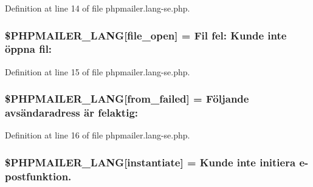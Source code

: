Definition at line 14 of file phpmailer.\+lang-\/se.\+php.

\subsubsection[{\texorpdfstring{\$\+P\+H\+P\+M\+A\+I\+L\+E\+R\+\_\+\+L\+A\+NG}{$PHPMAILER_LANG}}]{\setlength{\rightskip}{0pt plus 5cm}\$P\+H\+P\+M\+A\+I\+L\+E\+R\+\_\+\+L\+A\+NG\mbox{[}\textquotesingle{}file\+\_\+open\textquotesingle{}\mbox{]} = \textquotesingle{}Fil fel\+: Kunde inte öppna fil\+: \textquotesingle{}}\hypertarget{phpmailer_8lang-se_8php_a28d1a6517bf4c942a0ddd506188ad2e0}{}\label{phpmailer_8lang-se_8php_a28d1a6517bf4c942a0ddd506188ad2e0}


Definition at line 15 of file phpmailer.\+lang-\/se.\+php.

\subsubsection[{\texorpdfstring{\$\+P\+H\+P\+M\+A\+I\+L\+E\+R\+\_\+\+L\+A\+NG}{$PHPMAILER_LANG}}]{\setlength{\rightskip}{0pt plus 5cm}\$P\+H\+P\+M\+A\+I\+L\+E\+R\+\_\+\+L\+A\+NG\mbox{[}\textquotesingle{}from\+\_\+failed\textquotesingle{}\mbox{]} = \textquotesingle{}Följande avsändaradress är felaktig\+: \textquotesingle{}}\hypertarget{phpmailer_8lang-se_8php_adf832ae12155a09be077c6d5e4fd7e22}{}\label{phpmailer_8lang-se_8php_adf832ae12155a09be077c6d5e4fd7e22}


Definition at line 16 of file phpmailer.\+lang-\/se.\+php.

\subsubsection[{\texorpdfstring{\$\+P\+H\+P\+M\+A\+I\+L\+E\+R\+\_\+\+L\+A\+NG}{$PHPMAILER_LANG}}]{\setlength{\rightskip}{0pt plus 5cm}\$P\+H\+P\+M\+A\+I\+L\+E\+R\+\_\+\+L\+A\+NG\mbox{[}\textquotesingle{}instantiate\textquotesingle{}\mbox{]} = \textquotesingle{}Kunde inte initiera {\bf e}-\/postfunktion.\textquotesingle{}}\hypertarget{phpmailer_8lang-se_8php_ad58dde16780f4770ccf4dd282ea1f5ad}{}\label{phpmailer_8lang-se_8php_ad58dde16780f4770ccf4dd282ea1f5ad}


